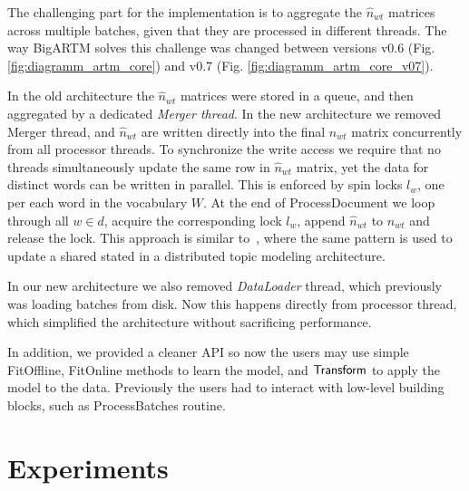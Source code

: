 \documentclass[russian,english]{llncs}
\newcommand{\kw}[1]{\mbox{\textsf{#1}}}
\begin{document}
The challenging part for the implementation is to aggregate the $\hat n_{wt}$ matrices across multiple batches,
given that they are processed in different threads.
The way BigARTM solves this challenge was changed between versions \kw{v0.6} (Fig. \ref{fig:diagramm_artm_core})
and \kw{v0.7} (Fig. \ref{fig:diagramm_artm_core_v07}).

In the old architecture the $\hat n_{wt}$ matrices were stored in a queue,
and then aggregated by a dedicated \emph{Merger thread}.
In the new architecture we removed Merger thread,
and $\hat n_{wt}$ are written directly into the final $n_{wt}$ matrix
concurrently from all processor threads.
To synchronize the write access we require that
no threads simultaneously update the same row in $\hat n_{wt}$ matrix,
yet the data for distinct words can be written in parallel.
This is enforced by spin locks $l_w$, one per each word in the vocabulary $W$.
At the end of \kw{ProcessDocument} we loop through all $w \in d$, acquire the corresponding lock $l_w$, append $\hat n_{wt}$ to $n_{wt}$ and release the lock.
This approach is similar to~\cite{smola10architecture},
where the same pattern is used to update a shared stated in a distributed topic modeling architecture.

In our new architecture we also removed \emph{DataLoader} thread, which previously was loading batches from disk.
Now this happens directly from processor thread, which simplified the architecture without sacrificing performance.

In addition, we provided a cleaner API so now the users may use simple \kw{FitOffline}, \kw{FitOnline} methods to learn the model,
and $\kw{Transform}$ to apply the model to the data.
Previously the users had to interact with low-level building blocks, such as \kw{ProcessBatches} routine.

\section{Experiments}
\label{sec:Experiments}
\end{document}
